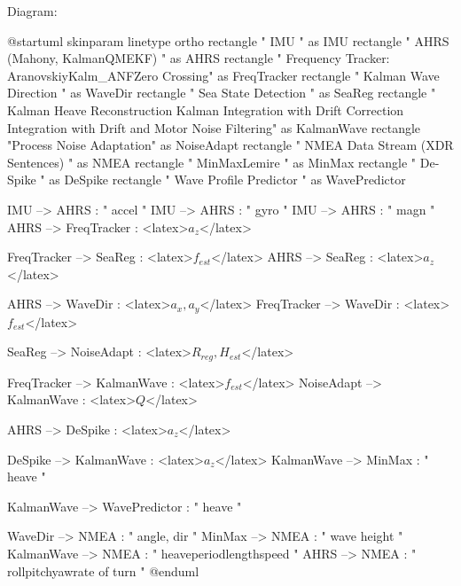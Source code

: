 \documentclass[11pt,letterpaper]{article}
\begin{document}
Diagram:

\begin{plantuml}
@startuml
skinparam linetype ortho
rectangle "                         IMU                          " as IMU
rectangle "                                                                AHRS (Mahony, KalmanQMEKF)                                                     " as AHRS
rectangle "    Frequency Tracker:     \n\n  Aranovskiy\n  Kalm_ANF\n  Zero Crossing" as FreqTracker
rectangle "    Kalman Wave Direction  " as WaveDir
rectangle "         Sea State Detection          " as SeaReg
rectangle "                             Kalman Heave Reconstruction                   \n\n         Kalman Integration with Drift Correction         \nKalman Integration with Drift and Motor Noise Filtering" as KalmanWave
rectangle "Process Noise Adaptation" as NoiseAdapt
rectangle "                         NMEA Data Stream (XDR Sentences)                      " as NMEA
rectangle "         MinMaxLemire      " as MinMax
rectangle "   De-Spike  " as DeSpike
rectangle " Wave Profile Predictor " as WavePredictor

IMU --> AHRS : " accel "
IMU --> AHRS : " gyro "
IMU --> AHRS : " magn "
AHRS --> FreqTracker : <latex>$a_{z}$</latex>

FreqTracker --> SeaReg : <latex>$f_{est}$</latex>
AHRS --> SeaReg : <latex>$a_{z}$</latex>

AHRS --> WaveDir : <latex>$a_{x}, a_{y}$</latex>
FreqTracker --> WaveDir : <latex>$f_{est}$</latex>

SeaReg --> NoiseAdapt : <latex>$R_{reg}, H_{est}$</latex>

FreqTracker --> KalmanWave : <latex>$f_{est}$</latex>
NoiseAdapt --> KalmanWave : <latex>$Q$</latex>

AHRS --> DeSpike : <latex>$a_{z}$</latex>

DeSpike --> KalmanWave : <latex>$a_{z}$</latex>
KalmanWave --> MinMax : " heave "

KalmanWave --> WavePredictor : " heave "

WaveDir --> NMEA : " angle, dir "
MinMax --> NMEA : " wave height "
KalmanWave --> NMEA : " heave\n period\n length\n speed "
AHRS --> NMEA : " roll\n pitch\n yaw\n rate of turn "
@enduml
\end{plantuml}
\end{document}
